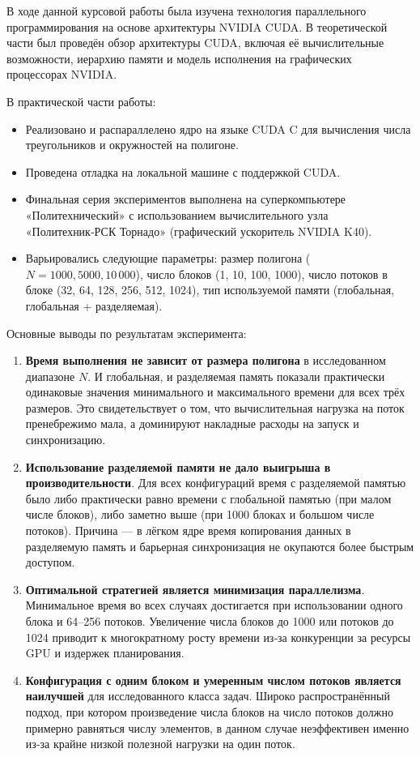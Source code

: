 \documentclass{article}[14pt]
\begin{document}
В ходе данной курсовой работы была изучена технология параллельного программирования на основе архитектуры NVIDIA CUDA.  
В теоретической части был проведён обзор архитектуры CUDA, включая её вычислительные возможности, иерархию памяти и модель исполнения на графических процессорах NVIDIA.  

\medskip

В практической части работы:
\begin{itemize}
    \item Реализовано и распараллелено ядро на языке CUDA C для вычисления числа треугольников и окружностей на полигоне.
    \item Проведена отладка на локальной машине с поддержкой CUDA.
    \item Финальная серия экспериментов выполнена на суперкомпьютере «Политехнический» с использованием вычислительного узла «Политехник‑РСК Торнадо» (графический ускоритель NVIDIA K40).
    \item Варьировались следующие параметры: размер полигона ($N = 1000, 5000, 10\,000$), число блоков (1, 10, 100, 1000), число потоков в блоке (32, 64, 128, 256, 512, 1024), тип используемой памяти (глобальная, глобальная + разделяемая).
\end{itemize}

Основные выводы по результатам эксперимента:

\begin{enumerate}
    \item \textbf{Время выполнения не зависит от размера полигона} в исследованном диапазоне $N$.  
    И глобальная, и разделяемая память показали практически одинаковые значения минимального и максимального времени для всех трёх размеров. Это свидетельствует о том, что вычислительная нагрузка на поток пренебрежимо мала, а доминируют накладные расходы на запуск и синхронизацию.

    \item \textbf{Использование разделяемой памяти не дало выигрыша в производительности}.  
    Для всех конфигураций время с разделяемой памятью было либо практически равно времени с глобальной памятью (при малом числе блоков), либо заметно выше (при 1000 блоках и большом числе потоков). Причина — в лёгком ядре время копирования данных в разделяемую память и барьерная синхронизация не окупаются более быстрым доступом.

    \item \textbf{Оптимальной стратегией является минимизация параллелизма}.  
    Минимальное время во всех случаях достигается при использовании одного блока и 64–256 потоков. Увеличение числа блоков до 1000 или потоков до 1024 приводит к многократному росту времени из‑за конкуренции за ресурсы GPU и издержек планирования.

    \item \textbf{Конфигурация с одним блоком и умеренным числом потоков является наилучшей} для исследованного класса задач. Широко распространённый подход, при котором произведение числа блоков на число потоков должно примерно равняться числу элементов, в данном случае неэффективен именно из‑за крайне низкой полезной нагрузки на один поток.
\end{enumerate}
\end{document}
